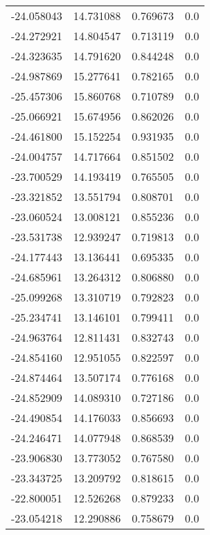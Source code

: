 \begin{tabular}{rrrr}
      -24.058043 &        14.731088 &    0.769673 &   0.0 \\
      -24.272921 &        14.804547 &    0.713119 &   0.0 \\
      -24.323635 &        14.791620 &    0.844248 &   0.0 \\
      -24.987869 &        15.277641 &    0.782165 &   0.0 \\
      -25.457306 &        15.860768 &    0.710789 &   0.0 \\
      -25.066921 &        15.674956 &    0.862026 &   0.0 \\
      -24.461800 &        15.152254 &    0.931935 &   0.0 \\
      -24.004757 &        14.717664 &    0.851502 &   0.0 \\
      -23.700529 &        14.193419 &    0.765505 &   0.0 \\
      -23.321852 &        13.551794 &    0.808701 &   0.0 \\
      -23.060524 &        13.008121 &    0.855236 &   0.0 \\
      -23.531738 &        12.939247 &    0.719813 &   0.0 \\
      -24.177443 &        13.136441 &    0.695335 &   0.0 \\
      -24.685961 &        13.264312 &    0.806880 &   0.0 \\
      -25.099268 &        13.310719 &    0.792823 &   0.0 \\
      -25.234741 &        13.146101 &    0.799411 &   0.0 \\
      -24.963764 &        12.811431 &    0.832743 &   0.0 \\
      -24.854160 &        12.951055 &    0.822597 &   0.0 \\
      -24.874464 &        13.507174 &    0.776168 &   0.0 \\
      -24.852909 &        14.089310 &    0.727186 &   0.0 \\
      -24.490854 &        14.176033 &    0.856693 &   0.0 \\
      -24.246471 &        14.077948 &    0.868539 &   0.0 \\
      -23.906830 &        13.773052 &    0.767580 &   0.0 \\
      -23.343725 &        13.209792 &    0.818615 &   0.0 \\
      -22.800051 &        12.526268 &    0.879233 &   0.0 \\
      -23.054218 &        12.290886 &    0.758679 &   0.0 \\

\end{tabular}
